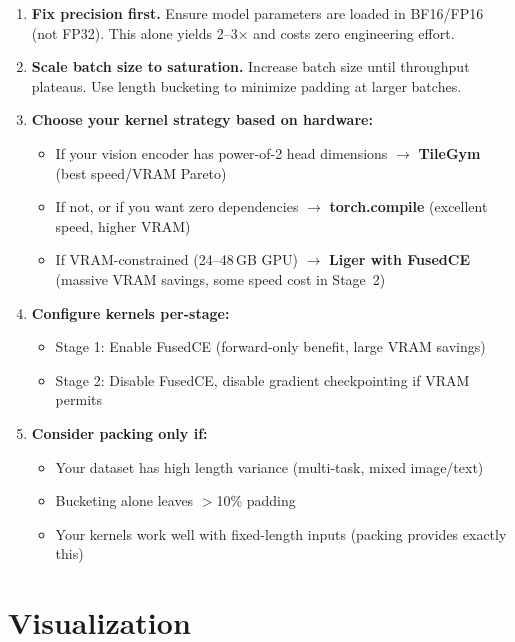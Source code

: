 \documentclass[11pt,a4paper]{article}
\begin{document}
\begin{enumerate}[leftmargin=*]
\item \textbf{Fix precision first.} Ensure model parameters are loaded in BF16/FP16
  (not FP32). This alone yields 2--3$\times$ and costs zero engineering effort.

\item \textbf{Scale batch size to saturation.} Increase batch size until throughput
  plateaus. Use length bucketing to minimize padding at larger batches.

\item \textbf{Choose your kernel strategy based on hardware:}
  \begin{itemize}[nosep]
    \item If your vision encoder has power-of-2 head dimensions $\to$ \textbf{TileGym}
      (best speed/VRAM Pareto)
    \item If not, or if you want zero dependencies $\to$ \textbf{torch.compile}
      (excellent speed, higher VRAM)
    \item If VRAM-constrained (24--48\,GB GPU) $\to$ \textbf{Liger with FusedCE}
      (massive VRAM savings, some speed cost in Stage~2)
  \end{itemize}

\item \textbf{Configure kernels per-stage:}
  \begin{itemize}[nosep]
    \item Stage 1: Enable FusedCE (forward-only benefit, large VRAM savings)
    \item Stage 2: Disable FusedCE, disable gradient checkpointing if VRAM permits
  \end{itemize}

\item \textbf{Consider packing only if:}
  \begin{itemize}[nosep]
    \item Your dataset has high length variance (multi-task, mixed image/text)
    \item Bucketing alone leaves $>$10\% padding
    \item Your kernels work well with fixed-length inputs (packing provides exactly this)
  \end{itemize}
\end{enumerate}

\section{Visualization}
\label{sec:figures}
\end{document}
